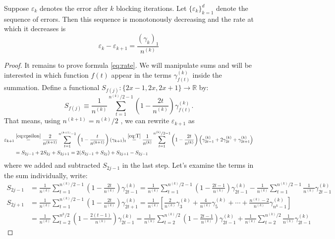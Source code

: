 \documentclass[11pt,english,a4paper]{article}
\begin{document}
\begin{prop}
Suppose $\varepsilon_k$ denotes the error after $k$ blocking iterations. Let $\{\varepsilon_k\}_{  k=1}^d$ denote the sequence of errors. Then this sequence is monotonously decreasing and the rate at which it decreases is
\begin{equation}
\varepsilon_k - \varepsilon_{  k+1} = \frac{(\gamma_k)_1 }{n^{(k)}} \label{eq:rate}
\end{equation}
\begin{proof}
It remains to prove formula \eqref{eq:rate}. We will manipulate sums and will be interested in which function $f(t)$ appear in the terms $\gamma^{(k)}_{f(t)}$ inside the summation. Define a functional $S_{f(j)} : \{2x-1,2x,2x+1\} \to \mathbb{R}$ by: 
\[S_{f(j)} \equiv \frac{1}{n^{(k)}} \sum_{t=1}^{n^{(k)}/2-1} \left( 1 - \frac{2t}{n^{(k)}} \right) \gamma^{(k)}_{f(t)}. \]
That means, using $n^{(k+1)} = n^{(k)}/2$ , we can rewrite $\varepsilon_{  k+1}$ as
\begin{align}
\varepsilon_{  k+1} &\stackrel{\eqref{eq:epsilon}}{=} \frac{2}{n^{(k+1)}} \sum_{t=1}^{n^{(k+1)}-1} \left( 1 - \frac{t}{n^{(k+1)}} \right) (\gamma_{k+1})_t \stackrel{\eqref{eq:T}}{=} \frac{1}{n^{(k)}} \sum_{t=1}^{n^{(k)}/2-1} \left( 1 - \frac{2t}{n^{(k)}} \right) \left( \gamma^{(k)}_{2t - 1} + 2\gamma^{(k)}_{2t} + \gamma^{(k)}_{2t + 1}\right) \nonumber \\
&= S_{2j-1} + 2S_{2j} + S_{2j+1} = 2(S_{2j-1} + S_{2j}) + S_{2j+1} - S_{2j-1} \label{eq:epsilonkpp}
\end{align}
where we added and subtracted $S_{2j - 1}$ in the last step. Let's examine the terms in the sum individually, write:
\begin{align}
S_{2j-1} &= \frac{1}{n^{(k)}} \sum_{t=1}^{n^{(k)}/2-1} \left( 1 - \frac{2t}{n^{(k)}} \right) \gamma^{(k)}_{2t - 1}  = \frac{1}{n^{(k)}}\sum_{t=1}^{n^{(k)}/2-1} \left( 1 - \frac{2t-1}{n^{(k)}}\right) \gamma^{(k)}_{2t - 1} - \frac{1}{n^{(k)}} \sum_{t=1}^{n^{(k)}/2-1} \frac{1}{n^{(k)}} \gamma^{(k)}_{2t - 1} \label{eq:sumB}
\\
S_{2j+1} &= \frac{1}{n^{(k)}} \sum_{t=1}^{n^{(k)}/2-1} \left( 1 - \frac{2t}{n^{(k)}} \right) \gamma^{(k)}_{2t + 1}  = \frac{1}{n^{(k)}} \left[ \frac{2}{n^{(k)}} \gamma^{(k)}_{3} + \frac{4}{n^{(k)}} \gamma^{(k)}_{5} + \cdots + \frac{n^{(k)} - 2}{n^{(k)}} \gamma^{(k)}_{n^{k} - 1}\right]\nonumber
 \\
 &= \frac{1}{n^{(k)}}\sum_{t=2}^{n^{k}/2} \left( 1 - \frac{2(t-1)}{n^{(k)}} \right) \gamma^{(k)}_{2t-1} = \frac{1}{n^{(k)}} \sum_{t=2}^{n^{(k)}/2} \left( 1 - \frac{2t-1}{n^{(k)}} \right) \gamma^{(k)}_{2t - 1} + \frac{1}{n^{(k)}}\sum_{t=2}^{n^{(k)}/2} \frac{1}{n^{(k)}} \gamma^{(k)}_{2t - 1}  \nonumber

\end{align}
\end{proof}
\end{prop}
\end{document}
